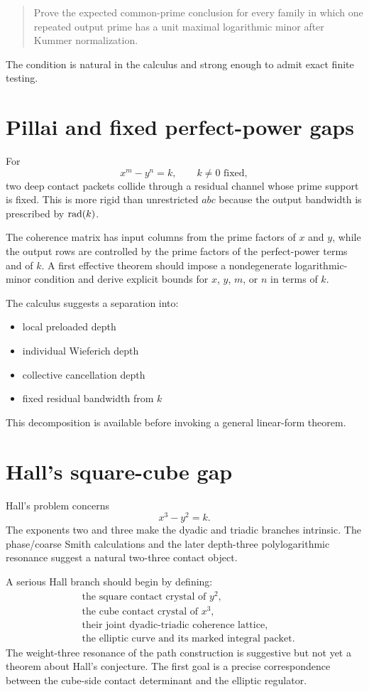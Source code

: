 \begin{quote}
Prove the expected common-prime conclusion for every family in which one repeated output prime has a unit maximal logarithmic minor after Kummer normalization.
\end{quote}

The condition is natural in the calculus and strong enough to admit exact finite testing.

\section{Pillai and fixed perfect-power gaps}
For
\[
x^m-y^n=k,
\qquad
k\ne0\text{ fixed},
\]
two deep contact packets collide through a residual channel whose prime support is fixed. This is more rigid than unrestricted $abc$ because the output bandwidth is prescribed by $\operatorname{rad}(k)$.

The coherence matrix has input columns from the prime factors of $x$ and $y$, while the output rows are controlled by the prime factors of the perfect-power terms and of $k$. A first effective theorem should impose a nondegenerate logarithmic-minor condition and derive explicit bounds for $x$, $y$, $m$, or $n$ in terms of $k$.

The calculus suggests a separation into:
\begin{itemize}[leftmargin=1.5em]
\item local preloaded depth
\item individual Wieferich depth
\item collective cancellation depth
\item fixed residual bandwidth from $k$
\end{itemize}
This decomposition is available before invoking a general linear-form theorem.

\section{Hall's square-cube gap}
Hall's problem concerns
\[
x^3-y^2=k.
\]
The exponents two and three make the dyadic and triadic branches intrinsic. The phase/coarse Smith calculations and the later depth-three polylogarithmic resonance suggest a natural two-three contact object.

A serious Hall branch should begin by defining:
\[
\begin{aligned}
&\text{the square contact crystal of }y^2,\\
&\text{the cube contact crystal of }x^3,\\
&\text{their joint dyadic-triadic coherence lattice},\\
&\text{the elliptic curve and its marked integral packet}.
\end{aligned}
\]
The weight-three resonance of the path construction is suggestive but not yet a theorem about Hall's conjecture. The first goal is a precise correspondence between the cube-side contact determinant and the elliptic regulator.

